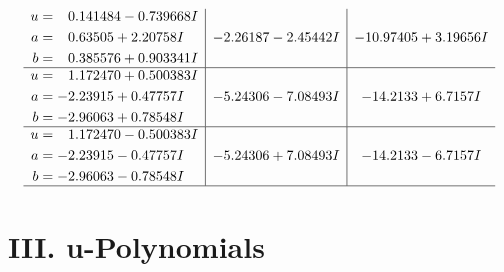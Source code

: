 \documentclass[1p]{elsarticle_modified}
\theoremstyle{definition}
\begin{document}
$$\begin{array}{c|c|c}
\begin{aligned}
u &= \phantom{-}0.141484 - 0.739668 I \\
a &= \phantom{-}0.63505 + 2.20758 I \\
b &= \phantom{-}0.385576 + 0.903341 I\end{aligned}
 & -2.26187 - 2.45442 I & -10.97405 + 3.19656 I \\ \hline\begin{aligned}
u &= \phantom{-}1.172470 + 0.500383 I \\
a &= -2.23915 + 0.47757 I \\
b &= -2.96063 + 0.78548 I\end{aligned}
 & -5.24306 - 7.08493 I & -14.2133 + 6.7157 I \\ \hline\begin{aligned}
u &= \phantom{-}1.172470 - 0.500383 I \\
a &= -2.23915 - 0.47757 I \\
b &= -2.96063 - 0.78548 I\end{aligned}
 & -5.24306 + 7.08493 I & -14.2133 - 6.7157 I\\
 \hline 
 \end{array}$$\newpage
\newpage\renewcommand{\arraystretch}{1}
\centering \section*{ III. u-Polynomials}
\end{document}
